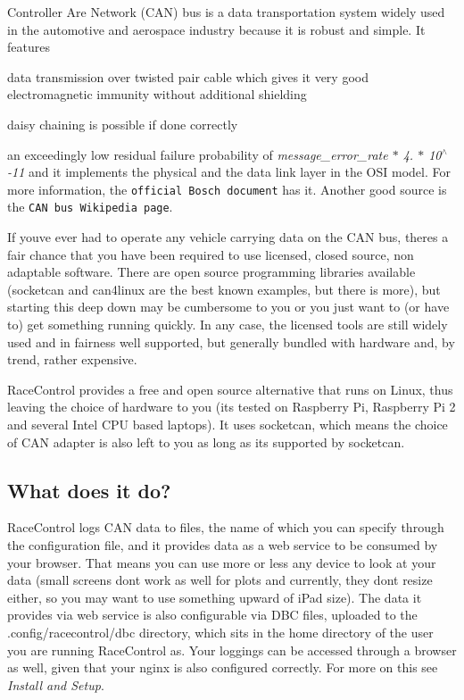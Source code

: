 Controller Are Network (C\+AN) bus is a data transportation system widely used in the automotive and aerospace industry because it is robust and simple. It features
\begin{DoxyItemize}
\item data transmission over twisted pair cable which gives it very good electromagnetic immunity without additional shielding
\item daisy chaining is possible if done correctly
\item an exceedingly low residual failure probability of {\itshape message\+\_\+error\+\_\+rate $\ast$ 4. $\ast$ 10$^\wedge$-\/11} and it implements the physical and the data link layer in the O\+SI model. For more information, the {\tt official Bosch document} has it. Another good source is the {\tt C\+AN bus Wikipedia page}.
\end{DoxyItemize}

If you\textquotesingle{}ve ever had to operate any vehicle carrying data on the C\+AN bus, there\textquotesingle{}s a fair chance that you have been required to use licensed, closed source, non adaptable software. There are open source programming libraries available ({\ttfamily socketcan} and {\ttfamily can4linux} are the best known examples, but there is more), but starting this deep down may be cumbersome to you or you just want to (or have to) get something running quickly. In any case, the licensed tools are still widely used and in fairness well supported, but generally bundled with hardware and, by trend, rather expensive.

{\ttfamily Race\+Control} provides a free and open source alternative that runs on Linux, thus leaving the choice of hardware to you (it\textquotesingle{}s tested on Raspberry Pi, Raspberry Pi 2 and several Intel C\+PU based laptops). It uses {\ttfamily socketcan}, which means the choice of C\+AN adapter is also left to you as long as it\textquotesingle{}s supported by {\ttfamily socketcan}.

\subsection*{What does it do? }

{\ttfamily Race\+Control} logs C\+AN data to files, the name of which you can specify through the configuration file, and it provides data as a web service to be consumed by your browser. That means you can use more or less any device to look at your data (small screens don\textquotesingle{}t work as well for plots and currently, they don\textquotesingle{}t resize either, so you may want to use something upward of i\+Pad size). The data it provides via web service is also configurable via D\+BC files, uploaded to the {\ttfamily .config/racecontrol/dbc} directory, which sits in the home directory of the user you are running {\ttfamily Race\+Control} as. Your loggings can be accessed through a browser as well, given that your {\ttfamily nginx} is also configured correctly. For more on this see {\itshape Install and Setup}.

